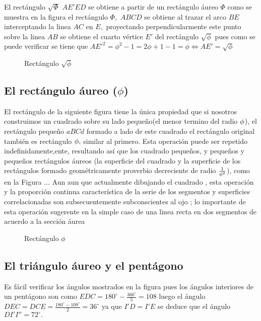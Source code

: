 El rectángulo $\sqrt{\Phi}$ $AE'ED$ se obtiene a partir de un rectángulo áureo $\Phi$ como se muestra en la figura el rectángulo $\Phi,$ $ABCD$ se obtiene al trazar el arco $BE$  interceptando la linea $AC$ en $E,$ proyectando perpendicularmente este punto sobre la linea $AB$ se obtiene el cuarto vértice $E'$ del rectángulo $\sqrt{\phi}$
pues como se puede verificar se tiene que ${AE'}^2=\phi^2-1=2\phi+1-1=\phi\Longleftrightarrow AE'=\sqrt{\phi}$
\begin{figure}[!ht]
	\begin{center}

	\end{center}

	\caption{Rectángulo $\sqrt{\phi}$}\label{p}
\end{figure}







\subsection{El rectángulo áureo ($\phi$)}
El rectángulo de la siguiente figura tiene la única propiedad que si nosotros construimos un cuadrado sobre su lado pequeño(el menor termino del radio $\phi$), el rectángulo pequeño $aBCd$ formado a lado de este cuadrado el rectángulo original también es rectángulo $\phi,$ similar al primero. Esta operación puede ser repetido indefinidamente,ente, resultando así que los cuadrado pequeños, y pequeños y pequeños rectángulos áureos (la superficie del cuadrado y la superficie de los rectángulos formado geométricamente proverbio decreciente de radio $\frac{1}{\phi^2}$), como en la Figura ... Aun aun que actualmente dibujando el cuadrado , esta operación  y la proporción continua característica de la serie de los segmentos y superficies correlacionadas son subsecuentemente subconscientes  al ojo ; lo importante de esta operación  sugerente en la simple caso de una linea recta en dos segmentos  de acuerdo  a la sección áurea


\begin{figure}[!ht]
	\begin{center}
	\end{center}
	\caption{Rectángulo $\phi$}\label{Uww}
\end{figure}



\subsection{El triángulo áureo y el pentágono}
Es fácil verificar los ángulos mostrados en la figura pues los ángulos interiores de un pentágono son  como $EDC=180^\circ-\frac{360^\circ}{5}=108$ luego el ángulo $DEC=DCE=\frac{180^\circ-108^\circ}{2}=36^\circ$  ya que $I'D=I'E$ se deduce que el ángulo $DI'I''=72^\circ.$

